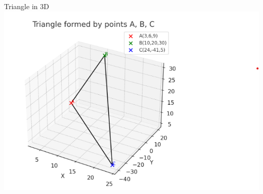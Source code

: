 \documentclass{beamer}
\begin{document}
\begin{frame}{Triangle in 3D}
\centering
\includegraphics[width=0.7\columnwidth]{figs/plot3.png}
\end{frame}
\end{document}
